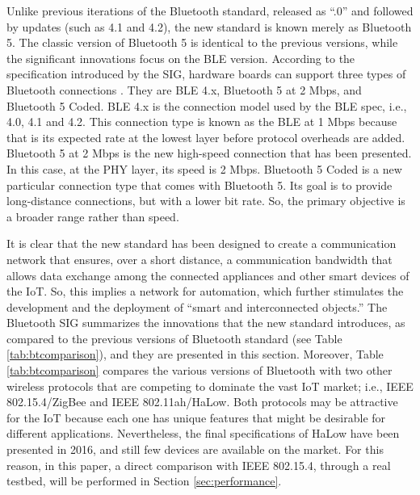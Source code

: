 \documentclass[12pt, draftclsnofoot, onecolumn]{IEEEtran}
\begin{document}
Unlike previous iterations of the Bluetooth standard, released as “.0” and followed by updates (such as 4.1 and 4.2), the new standard is known merely as Bluetooth 5. The classic version of Bluetooth 5 is identical to the previous versions, while the significant innovations focus on the BLE version. According to the specification introduced by the SIG, hardware boards can support three types of Bluetooth connections \cite{bt5release}. They are BLE 4.x, Bluetooth 5 at 2 Mbps, and Bluetooth 5 Coded. BLE 4.x is the connection model used by the BLE spec, i.e., 4.0, 4.1 and 4.2. This connection type is known as the BLE at 1 Mbps because that is its expected rate at the lowest layer before protocol overheads are added. Bluetooth 5 at 2 Mbps is the new high-speed connection that has been presented. In this case, at the PHY layer, its speed is 2 Mbps. Bluetooth 5 Coded is a new particular connection type that comes with Bluetooth 5. Its goal is to provide long-distance connections, but with a lower bit rate. So, the primary objective is a broader range rather than speed.

It is clear that the new standard has been designed to create a communication network that ensures, over a short distance, a communication bandwidth that allows data exchange among the connected appliances and other smart devices of the IoT. So, this implies a network for automation, which further stimulates the development and the deployment of “smart and interconnected objects.” The Bluetooth SIG summarizes the innovations that the new standard introduces, as compared to the previous versions of Bluetooth standard (see Table \ref{tab:btcomparison}), and they are presented in this section. Moreover, Table \ref{tab:btcomparison} compares the various versions of Bluetooth with two other wireless protocols that are competing to dominate the vast IoT market; i.e., IEEE 802.15.4/ZigBee and IEEE 802.11ah/HaLow. Both protocols may be attractive for the IoT because each one has unique features that might be desirable for different applications. Nevertheless, the final specifications of HaLow have been presented in 2016, and still few devices are available on the market. For this reason, in this paper, a direct comparison with IEEE 802.15.4, through a real testbed, will be performed in Section \ref{sec:performance}.
\end{document}
